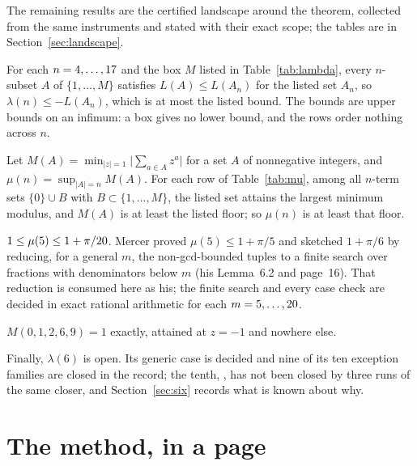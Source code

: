\documentclass[11pt]{article}
\begin{document}
The remaining results are the certified landscape around the theorem, collected from the same instruments and stated with their exact scope; the tables are in Section~\ref{sec:landscape}.

\begin{proposition}\label{prop:lamtable}
For each $n=4,\dots,17$ and the box $M$ listed in Table~\ref{tab:lambda}, every $n$-subset $A$ of $\{1,\dots,M\}$ satisfies $L(A)\le L(A_n)$ for the listed set $A_n$, so $\lambda(n)\le-L(A_n)$, which is at most the listed bound. The bounds are upper bounds on an infimum: a box gives no lower bound, and the rows order nothing across $n$.
\end{proposition}

\begin{proposition}\label{prop:mu}
Let $M(A)=\min_{|z|=1}\lvert\sum_{a\in A}z^a\rvert$ for a set $A$ of nonnegative integers, and $\mu(n)=\sup_{|A|=n}M(A)$. For each row of Table~\ref{tab:mu}, among all $n$-term sets $\{0\}\cup B$ with $B\subset\{1,\dots,M\}$, the listed set attains the largest minimum modulus, and $M(A)$ is at least the listed floor; so $\mu(n)$ is at least that floor.
\end{proposition}

\begin{theorem}\label{thm:ladder}
$1\le\mu(5)\le1+\pi/20$. Mercer proved $\mu(5)\le1+\pi/5$ and sketched $1+\pi/6$ by reducing, for a general $m$, the non-gcd-bounded tuples to a finite search over fractions with denominators below $m$ (his Lemma~6.2 and page~16). That reduction is consumed here as his; the finite search and every case check are decided in exact rational arithmetic for each $m=5,\dots,20$.
\end{theorem}

\begin{proposition}[an equality]\label{prop:eq}
$M(0,1,2,6,9)=1$ exactly, attained at $z=-1$ and nowhere else.
\end{proposition}

Finally, $\lambda(6)$ is open. Its generic case is decided and nine of its ten exception families are closed in the record; the tenth, \SixOpen, has not been closed by three runs of the same closer, and Section~\ref{sec:six} records what is known about why.

\section{The method, in a page}\label{sec:method}
\end{document}
